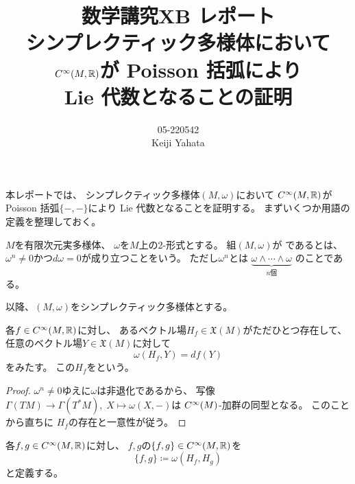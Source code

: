 \documentclass[report, notitlepage]{jlreq}
\title{
    数学講究XB レポート \\[1em]
    シンプレクティック多様体において \\[0.5ex]
    $C^\infty(M, \mathbb{R})$が
    Poisson 括弧により \\[0.5ex]
    Lie 代数となることの証明
}
\author{05-220542 \\ Keiji Yahata}
\date{}
\begin{document}
\maketitle

%
\newpage
\setcounter{section}{1}

本レポートでは、
シンプレクティック多様体$(M, \omega)$において
$C^\infty(M, \mathbb{R})$が
Poisson 括弧$\{ {-}, {-} \}$により
Lie 代数となることを証明する。
まずいくつか用語の定義を整理しておく。

\begin{definition}[シンプレクティック多様体]
    $M$を有限次元実\smooth 多様体、
    $\omega$を$M$上の2-形式とする。
    組$(M, \omega)$が
    であるとは、
    $\omega^n \neq 0$かつ$d\omega = 0$が成り立つことをいう。
    ただし$\omega^n$とは
    $\underbrace{\omega \wedge \cdots \wedge \omega}_{\text{$n$個}}$
    のことである。
\end{definition}

以降、$(M, \omega)$をシンプレクティック多様体とする。

\begin{propdef}
    各$f \in C^\infty(M, \mathbb{R})$に対し、
    あるベクトル場$H_f \in \mathfrak{X}(M)$がただひとつ存在して、
    任意のベクトル場$Y \in \mathfrak{X}(M)$に対して
    \begin{equation}
        \omega(H_f, Y) = df(Y)
    \end{equation}
    をみたす。
    この$H_f$をという。
\end{propdef}

\begin{proof}
    $\omega^n \neq 0$ゆえに$\omega$は非退化であるから、
    写像
    $\Gamma(TM) \to \Gamma(T^*M), \; X \mapsto \omega(X, {-})$は
    $C^\infty(M)$-加群の同型となる。
    このことから直ちに
    $H_f$の存在と一意性が従う。
\end{proof}

\begin{definition}[Poisson 括弧]
    各$f, g \in C^\infty(M, \mathbb{R})$に対し、
    $f, g$の$\{ f, g \} \in C^\infty(M, \mathbb{R})$を
    \begin{equation}
        \{ f, g \} \coloneqq \omega(H_f, H_g)
    \end{equation}
    と定義する。
\end{definition}
\end{document}
